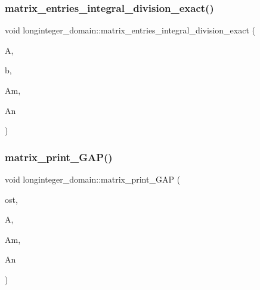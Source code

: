\subsubsection{\texorpdfstring{matrix\+\_\+entries\+\_\+integral\+\_\+division\+\_\+exact()}{matrix\_entries\_integral\_division\_exact()}}
{\footnotesize\ttfamily void longinteger\+\_\+domain\+::matrix\+\_\+entries\+\_\+integral\+\_\+division\+\_\+exact (\begin{DoxyParamCaption}\item[{\mbox{\hyperlink{classlonginteger__object}{longinteger\+\_\+object}} $\ast$}]{A,  }\item[{\mbox{\hyperlink{classlonginteger__object}{longinteger\+\_\+object}} \&}]{b,  }\item[{\mbox{\hyperlink{galois_8h_a09fddde158a3a20bd2dcadb609de11dc}{I\+NT}}}]{Am,  }\item[{\mbox{\hyperlink{galois_8h_a09fddde158a3a20bd2dcadb609de11dc}{I\+NT}}}]{An }\end{DoxyParamCaption})}

\mbox{\label{classlonginteger__domain_a2abfccb7354485b5f0428e5c5617442d}} 
\subsubsection{\texorpdfstring{matrix\+\_\+print\+\_\+\+G\+A\+P()}{matrix\_print\_GAP()}}
{\footnotesize\ttfamily void longinteger\+\_\+domain\+::matrix\+\_\+print\+\_\+\+G\+AP (\begin{DoxyParamCaption}\item[{ostream \&}]{ost,  }\item[{\mbox{\hyperlink{classlonginteger__object}{longinteger\+\_\+object}} $\ast$}]{A,  }\item[{\mbox{\hyperlink{galois_8h_a09fddde158a3a20bd2dcadb609de11dc}{I\+NT}}}]{Am,  }\item[{\mbox{\hyperlink{galois_8h_a09fddde158a3a20bd2dcadb609de11dc}{I\+NT}}}]{An }\end{DoxyParamCaption})}

\mbox{\label{classlonginteger__domain_a8c4b67760aebf25cfe270f7227066576}} 
